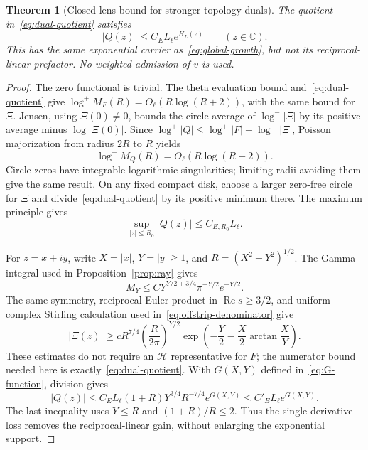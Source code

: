 \documentclass[11pt,a4paper]{article}
\numberwithin{equation}{section}
\newtheorem{theorem}{Theorem}[section]
\theoremstyle{definition}
\theoremstyle{remark}
\newcommand{\C}{\mathbb C}
\newcommand{\Hh}{\mathcal H}
\begin{document}
\begin{theorem}[Closed-lens bound for stronger-topology duals]\label{thm:dual-lens}
The quotient in~\eqref{eq:dual-quotient} satisfies
\begin{equation}\label{eq:dual-lens}
 |Q(z)|\le C_E L_\ell e^{H_L(z)}\qquad(z\in\C).
\end{equation}
This has the same exponential carrier as~\eqref{eq:global-growth}, but not its reciprocal-linear prefactor. No weighted admission of $v$ is used.
\end{theorem}
\begin{proof}
The zero functional is trivial. The theta evaluation bound and~\eqref{eq:dual-quotient} give
$\log^+M_F(R)=O_\ell(R\log(R+2))$, with the same bound for $\Xi$.
Jensen, using $\Xi(0)\ne0$, bounds the circle average of $\log^-|\Xi|$ by its positive average minus $\log|\Xi(0)|$. Since
$\log^+|Q|\le\log^+|F|+\log^-|\Xi|$, Poisson majorization from radius $2R$ to $R$ yields
\begin{equation}\label{eq:dual-order}
 \log^+M_Q(R)=O_\ell(R\log(R+2)).
\end{equation}
Circle zeros have integrable logarithmic singularities; limiting radii avoiding them give the same result. On any fixed compact disk, choose a larger zero-free circle for $\Xi$ and divide~\eqref{eq:dual-quotient} by its positive minimum there. The maximum principle gives
\begin{equation}\label{eq:dual-local}
 \sup_{|z|\le R_0}|Q(z)|\le C_{E,R_0}L_\ell.
\end{equation}

For $z=x+iy$, write $X=|x|$, $Y=|y|\ge1$, and $R=(X^2+Y^2)^{1/2}$. The Gamma integral used in Proposition~\ref{prop:ray} gives
\[
 M_Y\le C Y^{Y/2+3/4}\pi^{-Y/2}e^{-Y/2}.
\]
The same symmetry, reciprocal Euler product in $\operatorname{Re}s\ge3/2$, and uniform complex Stirling calculation used in~\eqref{eq:offstrip-denominator} give
\[
 |\Xi(z)|\ge cR^{7/4}\left(\frac R{2\pi}\right)^{Y/2}
       \exp\left(-\frac Y2-\frac X2\arctan\frac XY\right).
\]
These estimates do not require an $\Hh$ representative for $F$; the numerator bound needed here is exactly~\eqref{eq:dual-quotient}. With $G(X,Y)$ defined in~\eqref{eq:G-function}, division gives
\[
 |Q(z)|\le C_E L_\ell(1+R)Y^{3/4}R^{-7/4}e^{G(X,Y)}
 \le C'_E L_\ell e^{G(X,Y)}.
\]
The last inequality uses $Y\le R$ and $(1+R)/R\le2$. Thus the single derivative loss removes the reciprocal-linear gain, without enlarging the exponential support.


\end{proof}
\end{document}
